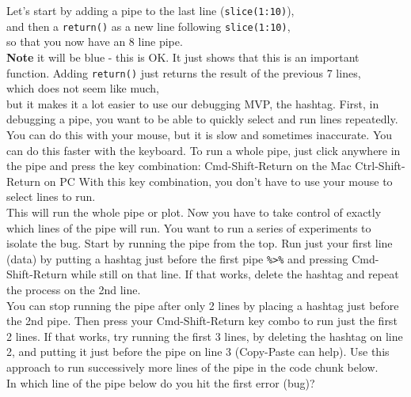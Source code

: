 \documentclass[
]{book}
\newenvironment{Shaded}{\begin{snugshade}}{\end{snugshade}}
\newcommand{\DataTypeTok}[1]{\textcolor[rgb]{0.13,0.29,0.53}{#1}}
\newcommand{\DecValTok}[1]{\textcolor[rgb]{0.00,0.00,0.81}{#1}}
\newcommand{\KeywordTok}[1]{\textcolor[rgb]{0.13,0.29,0.53}{\textbf{#1}}}
\newcommand{\NormalTok}[1]{#1}
\newcommand{\OperatorTok}[1]{\textcolor[rgb]{0.81,0.36,0.00}{\textbf{#1}}}
\newcommand{\StringTok}[1]{\textcolor[rgb]{0.31,0.60,0.02}{#1}}
\begin{document}
Let's start by adding a pipe to the last line (\texttt{slice(1:10)}),\\
and then a \texttt{return()} as a new line following \texttt{slice(1:10)},\\
so that you now have an 8 line pipe.\\
\textbf{Note} it will be blue - this is OK.
It just shows that this is an important function.
Adding \texttt{return()} just returns the result of the previous 7 lines,\\
which does not seem like much,\\
but it makes it a lot easier to use our debugging MVP, the hashtag.
First, in debugging a pipe, you want to be able to quickly select and run lines repeatedly. You can do this with your mouse, but it is slow and sometimes inaccurate.
You can do this faster with the keyboard.
To run a whole pipe, just click anywhere in the pipe and press the key combination:
Cmd-Shift-Return on the Mac
Ctrl-Shift-Return on PC
With this key combination, you don't have to use your mouse to select lines to run.\\
This will run the whole pipe or plot.
Now you have to take control of exactly which lines of the pipe will run.
You want to run a series of experiments to isolate the bug.
Start by running the pipe from the top.
Run just your first line (data) by putting a hashtag just before the first pipe \texttt{\%\textgreater{}\%} and pressing Cmd-Shift-Return while still on that line. If that works, delete the hashtag and repeat the process on the 2nd line. \\
You can stop running the pipe after only 2 lines by placing a hashtag just before the 2nd pipe. Then press your Cmd-Shift-Return key combo to run just the first 2 lines.
If that works, try running the first 3 lines, by deleting the hashtag on line 2, and putting it just before the pipe on line 3 (Copy-Paste can help).
Use this approach to run successively more lines of the pipe in the code chunk below.\\
In which line of the pipe below do you hit the first error (bug)?

\begin{Shaded}
\end{Shaded}
\end{document}
